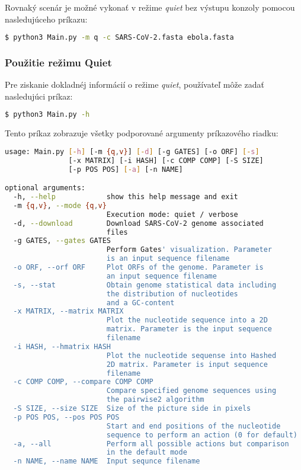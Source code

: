 \bigskip
Rovnaký scenár je možné vykonať v režime \textit{quiet} bez výstupu konzoly pomocou nasledujúceho príkazu:
\begin{lstlisting}[language=bash]
  $ python3 Main.py -m q -c SARS-CoV-2.fasta ebola.fasta
\end{lstlisting}


\subsubsection{Použitie režimu Quiet}
Pre ziskanie dokladnéj informácií o režime \textit{quiet}, používateľ môže zadať nasledujúci príkaz:
\begin{lstlisting}[language=bash]
  $ python3 Main.py -h
\end{lstlisting}

Tento príkaz zobrazuje všetky podporované argumenty príkazového riadku:
\begin{lstlisting}[language=bash]
usage: Main.py [-h] [-m {q,v}] [-d] [-g GATES] [-o ORF] [-s] 
               [-x MATRIX] [-i HASH] [-c COMP COMP] [-S SIZE]
               [-p POS POS] [-a] [-n NAME]

optional arguments:
  -h, --help            show this help message and exit
  -m {q,v}, --mode {q,v}
                        Execution mode: quiet / verbose
  -d, --download        Download SARS-CoV-2 genome associated 
                        files
  -g GATES, --gates GATES
                        Perform Gates' visualization. Parameter
                        is an input sequence filename
  -o ORF, --orf ORF     Plot ORFs of the genome. Parameter is 
                        an input sequence filename
  -s, --stat            Obtain genome statistical data including
                        the distribution of nucleotides 
                        and a GC-content
  -x MATRIX, --matrix MATRIX
                        Plot the nucleotide sequence into a 2D 
                        matrix. Parameter is the input sequence 
                        filename
  -i HASH, --hmatrix HASH
                        Plot the nucleotide sequense into Hashed
                        2D matrix. Parameter is input sequence 
                        filename
  -c COMP COMP, --compare COMP COMP
                        Compare specified genome sequences using 
                        the pairwise2 algorithm
  -S SIZE, --size SIZE  Size of the picture side in pixels
  -p POS POS, --pos POS POS
                        Start and end positions of the nucleotide 
                        sequence to perform an action (0 for default)
  -a, --all             Perform all possible actions but comparison
                        in the default mode
  -n NAME, --name NAME  Input sequnce filename
\end{lstlisting}


